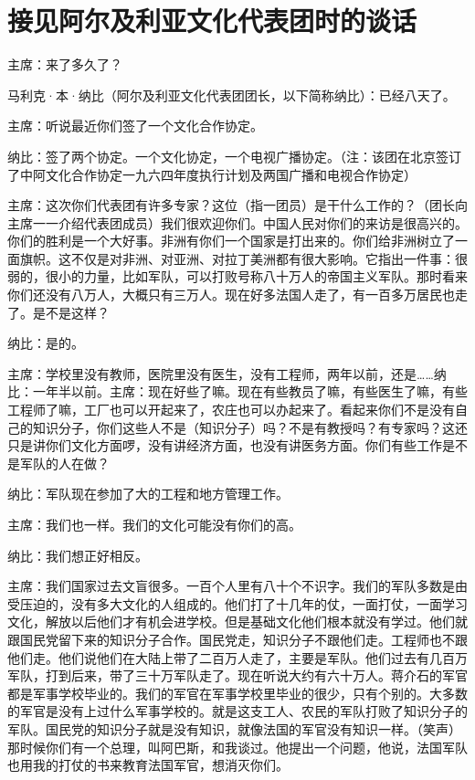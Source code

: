 \section[接见阿尔及利亚文化代表团时的谈话（一九六四年四月十五日）]{接见阿尔及利亚文化代表团时的谈话}


主席：来了多久了？

马利克·本·纳比（阿尔及利亚文化代表团团长，以下简称纳比）：已经八天了。

主席：听说最近你们签了一个文化合作协定。

纳比：签了两个协定。一个文化协定，一个电视广播协定。（注：该团在北京签订了中阿文化合作协定一九六四年度执行计划及两国广播和电视合作协定）

主席：这次你们代表团有许多专家？这位（指一团员）是干什么工作的？（团长向主席一一介绍代表团成员）我们很欢迎你们。中国人民对你们的来访是很高兴的。你们的胜利是一个大好事。非洲有你们一个国家是打出来的。你们给非洲树立了一面旗帜。这不仅是对非洲、对亚洲、对拉丁美洲都有很大影响。它指出一件事：很弱的，很小的力量，比如军队，可以打败号称八十万人的帝国主义军队。那时看来你们还没有八万人，大概只有三万人。现在好多法国人走了，有一百多万居民也走了。是不是这样？

纳比：是的。

主席：学校里没有教师，医院里没有医生，没有工程师，两年以前，还是……纳比：一年半以前。主席：现在好些了嘛。现在有些教员了嘛，有些医生了嘛，有些工程师了嘛，工厂也可以开起来了，农庄也可以办起来了。看起来你们不是没有自己的知识分子，你们这些人不是（知识分子）吗？不是有教授吗？有专家吗？这还只是讲你们文化方面啰，没有讲经济方面，也没有讲医务方面。你们有些工作是不是军队的人在做？

纳比：军队现在参加了大的工程和地方管理工作。

主席：我们也一样。我们的文化可能没有你们的高。

纳比：我们想正好相反。

主席：我们国家过去文盲很多。一百个人里有八十个不识字。我们的军队多数是由受压迫的，没有多大文化的人组成的。他们打了十几年的仗，一面打仗，一面学习文化，解放以后他们才有机会进学校。但是基础文化他们根本就没有学过。他们就跟国民党留下来的知识分子合作。国民党走，知识分子不跟他们走。工程师也不跟他们走。他们说他们在大陆上带了二百万人走了，主要是军队。他们过去有几百万军队，打到后来，带了三十万军队走了。现在听说大约有六十万人。蒋介石的军官都是军事学校毕业的。我们的军官在军事学校里毕业的很少，只有个别的。大多数的军官是没有上过什么军事学校的。就是这支工人、农民的军队打败了知识分子的军队。国民党的知识分子就是没有知识，就像法国的军官没有知识一样。（笑声）那时候你们有一个总理，叫阿巴斯，和我谈过。他提出一个问题，他说，法国军队也用我的打仗的书来教育法国军官，想消灭你们。

